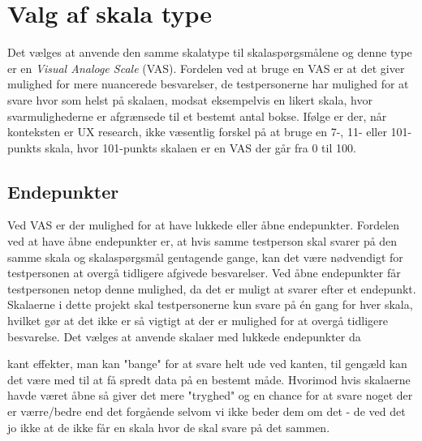\section{Valg af skala type}
\label{ParametreSkalaType}
%
Det vælges at anvende den samme skalatype til skalaspørgsmålene og denne type er en \textit{Visual Analoge Scale} (VAS). Fordelen ved at bruge en VAS er at det giver mulighed for mere nuancerede besvarelser, de testpersonerne har mulighed for at svare hvor som helst på skalaen, modsat eksempelvis en likert skala, hvor svarmulighederne er afgrænsede til et bestemt antal bokse. \blankline
%
Ifølge \textcite[s. 73]{PDF:RatingScales} er der, når konteksten er UX research, ikke væsentlig forskel på at bruge en 7-, 11- eller 101-punkts skala, hvor 101-punkts skalaen er en VAS der går fra 0 til 100. 
%
\subsection{Endepunkter}
Ved VAS er der mulighed for at have lukkede eller åbne endepunkter. Fordelen ved at have åbne endepunkter er, at hvis samme testperson skal svarer på den samme skala og skalaspørgsmål gentagende gange, kan det være nødvendigt for testpersonen at overgå tidligere afgivede besvarelser. Ved åbne endepunkter får testpersonen netop denne mulighed, da det er muligt at svarer efter et endepunkt. Skalaerne i dette projekt skal testpersonerne kun svare på én gang for hver skala, hvilket gør at det ikke er så vigtigt at der er mulighed for at overgå tidligere besvarelse. \blankline
%
Det vælges at anvende skalaer med lukkede endepunkter da 

kant effekter, man kan "bange" for at svare helt ude ved kanten, til gengæld kan det være med til at få spredt data på en bestemt måde. Hvorimod hvis skalaerne havde været åbne så giver det mere "tryghed" og en chance for at svare noget der er værre/bedre end det forgående selvom vi ikke beder dem om det - de ved det jo ikke at de ikke får en skala hvor de skal svare på det sammen. 
%
